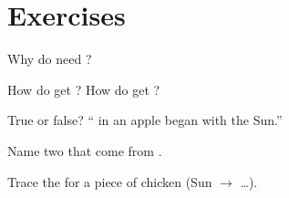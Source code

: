 \section{Exercises}

\begin{exercise}[$\star$]\label{exo:g2:food-energy:1}
Why do  need ?
\end{exercise}

\begin{exercise}[$\star$]\label{exo:g2:food-energy:2}
How do  get ? How do  get ?
\end{exercise}

\begin{exercise}[$\star$]\label{exo:g2:food-energy:3}
True or false? `` in an apple began with the Sun.''
\end{exercise}

\begin{exercise}[$\star$]\label{exo:g2:food-energy:4}
Name two  that come from .
\end{exercise}

\begin{exercise}[$\star\star$]\label{exo:g2:food-energy:5}
Trace the  for a piece of chicken (Sun $\to$ \dots).
\end{exercise}

